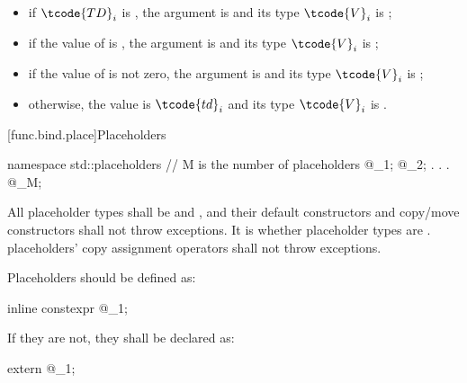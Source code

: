 \begin{itemize}
\item if $\tcode{TD}_i$ is , the
argument is  and its type $\tcode{V}_i$ is ;

\item if the value of 
is , the argument is   and its
type $\tcode{V}_i$ is
;

\item if the value  of 
is not zero, the  argument is 
and its type $\tcode{V}_i$
is ;

\item otherwise, the value is $\tcode{td}_i$ and its type $\tcode{V}_i$
is .
\end{itemize}
%

[func.bind.place]{Placeholders}

%
%
\begin{codeblock}
namespace std::placeholders {
  // M is the  number of placeholders
  @\seebelow@ _1;
  @\seebelow@ _2;
              .
              .
              .
  @\seebelow@ _M;
}
\end{codeblock}

\pnum
All placeholder types shall be  and
, and their default constructors and copy/move
constructors shall not throw exceptions. It is  whether
placeholder types are .  placeholders' copy
assignment operators shall not throw exceptions.

\pnum
Placeholders should be defined as:
\begin{codeblock}
inline constexpr @\unspec@ _1{};
\end{codeblock}
If they are not, they shall be declared as:
\begin{codeblock}
extern @\unspec@ _1;
\end{codeblock}%

